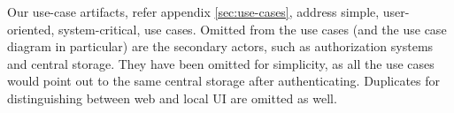 Our use-case artifacts, refer appendix \ref{sec:use-cases}, address simple, user-oriented, system-critical, use cases.
Omitted from the use cases (and the use case diagram in particular) are the secondary actors, such as authorization systems and central storage.
They have been omitted for simplicity, as all the use cases would point out to the same central storage after authenticating. Duplicates for distinguishing between web  and local UI are omitted as well.